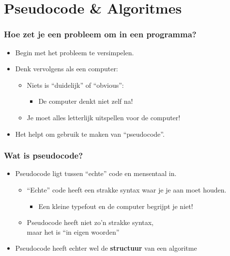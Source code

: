\section{Pseudocode & Algoritmes}

\begin{frame}
\frametitle{Hoe zet je een probleem om in een programma?}

\begin{itemize}
  \item<1-> Begin met het probleem te versimpelen.
  \item<2-> Denk vervolgens als een computer:
  \begin{itemize}
  	\item<3-> Niets is ``duidelijk'' of ``obvious'': 
	  \begin{itemize}
	  	\item<4-> De computer denkt niet zelf na!
	  \end{itemize}
  	\item<5-> Je moet alles letterlijk uitspellen voor de computer!
  \end{itemize}
  \item<6-> Het helpt om gebruik te maken van ``pseudocode''.
\end{itemize}

\end{frame}



\begin{frame}
\frametitle{Wat is pseudocode?}

\begin{itemize}
  \item<1-> Pseudocode ligt tussen ``echte'' code en mensentaal in.
  \begin{itemize}
  	\item<2-> ``Echte'' code heeft een strakke syntax waar je je aan moet houden.
  	\begin{itemize}
  	  \item<3-> Een kleine typefout en de computer begrijpt je niet!
  	\end{itemize}
  	\item<4-> Pseudocode heeft niet zo'n strakke syntax,\\maar het is ``in eigen woorden''
  \end{itemize}
  \item<5-> Pseudocode heeft echter wel de \textbf{structuur} van een algoritme
\end{itemize}

\end{frame}




